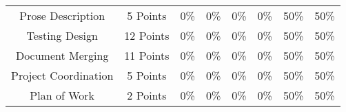{\begin{centering}
\begin{tabular}{cc|c|c|c|c|c|c|}
\multicolumn{1}{|c|}{Prose Description} & \multicolumn{1}{c|}{5 Points} & 
0\% & 0\% & 0\% & 0\% & 50\% & 50\% \\ \cline{1-8}
\multicolumn{1}{|c|}{Testing Design} & \multicolumn{1}{c|}{12 Points} & 
0\% & 0\% & 0\% & 0\% & 50\% & 50\% \\ \cline{1-8}
\multicolumn{1}{|c|}{Document Merging} & \multicolumn{1}{c|}{11 Points} & 
0\% & 0\% & 0\% & 0\% & 50\% & 50\% \\ \cline{1-8}
\multicolumn{1}{|c|}{Project Coordination} & \multicolumn{1}{c|}{5 Points} & 
0\% & 0\% & 0\% & 0\% & 50\% & 50\% \\ \cline{1-8}
\multicolumn{1}{|c|}{Plan of Work} & \multicolumn{1}{c|}{2 Points} & 
0\% & 0\% & 0\% & 0\% & 50\% & 50\% \\ \cline{1-8}
\end{tabular}
\end{centering}
}